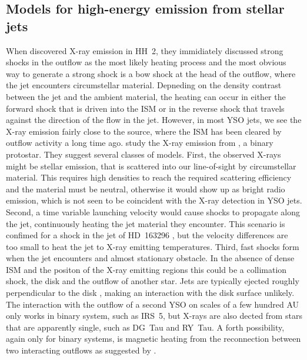 \subsection{Models for high-energy emission from stellar jets}
\label{sect:intromodel}
When \citet{2001Natur.413..708P} discovered X-ray emission in HH~2, they immidiately discussed strong shocks in the outflow as the most likely heating process and the most obvious way to generate a strong shock is a bow shock at the head of the outflow, where the jet encounters circumstellar material. Depneding on the density contrast between the jet and the ambient material, the heating can occur in either the forward shock that is driven into the ISM or in the reverse shock that travels against the direction of the flow in the jet. However, in most YSO jets, we see the X-ray emission fairly close to the source, where the ISM has been cleared by outflow activity a long time ago. \citet{2003ApJ...584..843B} study the X-ray emission from , a binary protostar. They suggest several classes of models. First, the observed X-rays might be stellar emission, that is scattered into our line-of-sight by circumstellar material. This requires high densities to reach the required scattering efficiency and the material must be neutral, otherwise it would show up as bright radio emission, which is not seen to be coincident with the X-ray detection in YSO jets. Second, a time variable launching velocity would cause shocks to propagate along the jet, continuously heating the jet material they encounter. This scenario is confimed for a shock in the jet of HD~163296 \citep{2013A&A...552A.142G}, but the velocity differences are too small to heat the jet to X-ray emitting temperatures. Third, fast shocks form when the jet encounters and almost stationary obstacle. In the absence of dense ISM and the positon of the X-ray emitting regions this could be a collimation shock, the disk and the outflow of another star. Jets are typically ejected roughly perpendicular to the disk \citep[e.g.][for IRS 5]{2002A&A...382..573F}, making an interaction with the disk surface unlikely. The interaction with the outflow of a second YSO on scales of a few hundred AU only works in binary system, such as IRS~5, but X-rays are also dected from stars that are apparently single, such as DG~Tau and RY~Tau. A forth possibility, again only for binary systems, is magnetic heating from the reconnection between two interacting outflows as suggested by \citet{2008A&A...478..453M}.

